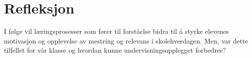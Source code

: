 \documentclass[main.tex]{subfiles}
\begin{document}
\section*{Refleksjon}
\label{sec:3}
I følge  vil læringsprosesser som fører til forståelse bidra til å styrke elevenes motivasjon og 
opplevelse av mestring og relevans i skolehverdagen. Men, var dette tilfellet for vår klasse og hvordan
kunne undervisningsopplegget forbedres?

\end{document}
